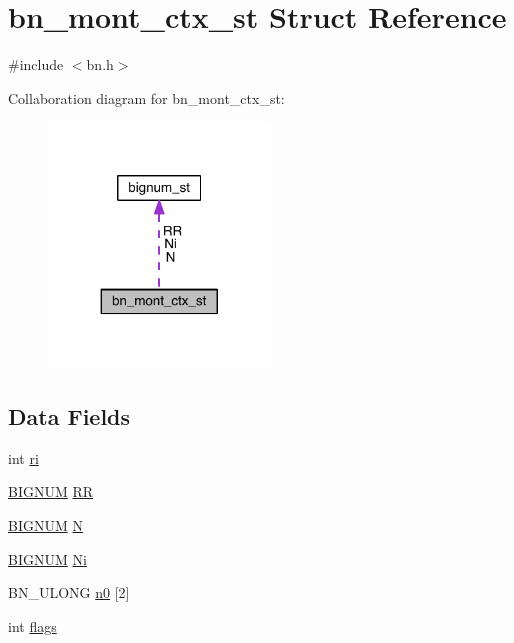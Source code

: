 \hypertarget{structbn__mont__ctx__st}{}\section{bn\+\_\+mont\+\_\+ctx\+\_\+st Struct Reference}
\label{structbn__mont__ctx__st}


{\ttfamily \#include $<$bn.\+h$>$}



Collaboration diagram for bn\+\_\+mont\+\_\+ctx\+\_\+st\+:\nopagebreak
\begin{figure}[H]
\begin{center}
\leavevmode
\includegraphics[width=167pt]{structbn__mont__ctx__st__coll__graph}
\end{center}
\end{figure}
\subsection*{Data Fields}
\begin{DoxyCompactItemize}
\item 
int \hyperlink{structbn__mont__ctx__st_adefccf195553a86b78e30f79147bb619}{ri}
\item 
\hyperlink{crypto_2ossl__typ_8h_a6fb19728907ec6515e4bfb716bffa141}{B\+I\+G\+N\+UM} \hyperlink{structbn__mont__ctx__st_ad99ae4970cb39992572fc82ab7990fde}{RR}
\item 
\hyperlink{crypto_2ossl__typ_8h_a6fb19728907ec6515e4bfb716bffa141}{B\+I\+G\+N\+UM} \hyperlink{structbn__mont__ctx__st_ad0a9b4b193ae5312d7260bedd97090b9}{N}
\item 
\hyperlink{crypto_2ossl__typ_8h_a6fb19728907ec6515e4bfb716bffa141}{B\+I\+G\+N\+UM} \hyperlink{structbn__mont__ctx__st_a40f495d7fe7da52b68a829c6de297bc8}{Ni}
\item 
B\+N\+\_\+\+U\+L\+O\+NG \hyperlink{structbn__mont__ctx__st_a465ab6b2e94695ea60d15169ac9fea9e}{n0} \mbox{[}2\mbox{]}
\item 
int \hyperlink{structbn__mont__ctx__st_ac8bf36fe0577cba66bccda3a6f7e80a4}{flags}
\end{DoxyCompactItemize}


